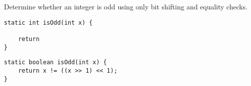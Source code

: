 \question Determine whether an integer is odd using only bit shifting and equality checks.

\ifprintanswers\else
\begin{lstlisting}
static int isOdd(int x) {

    return
}
\end{lstlisting}
\fi

\begin{solution}
\begin{lstlisting}
static boolean isOdd(int x) {
    return x != ((x >> 1) << 1);
}
\end{lstlisting}
\end{solution}